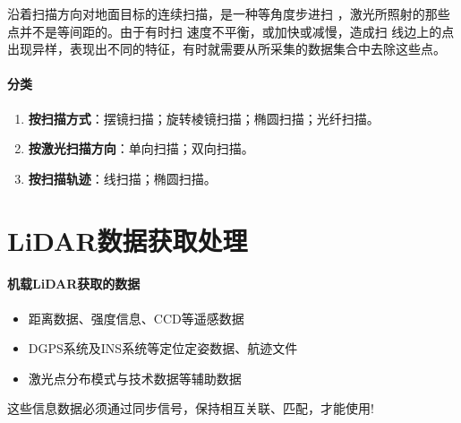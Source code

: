 沿着扫描方向对地面目标的连续扫描，是一种等角度步进扫 ，激光所照射的那些点并不是等间距的。由于有时扫 速度不平衡，或加快或减慢，造成扫 线边上的点出现异样，表现出不同的特征，有时就需要从所采集的数据集合中去除这些点。

\paragraph{分类}
\begin{enumerate}
	\item \textbf{按扫描方式}：摆镜扫描；旋转棱镜扫描；椭圆扫描；光纤扫描。
	\item \textbf{按激光扫描方向}：单向扫描；双向扫描。
	\item \textbf{按扫描轨迹}：线扫描；椭圆扫描。
\end{enumerate}

\section{LiDAR数据获取处理}

\paragraph{机载LiDAR获取的数据}
\begin{itemize}
	\item 距离数据、强度信息、CCD等遥感数据
	\item DGPS系统及INS系统等定位定姿数据、航迹文件
	\item 激光点分布模式与技术数据等辅助数据
\end{itemize}
这些信息数据必须通过同步信号，保持相互关联、匹配，才能使用!

